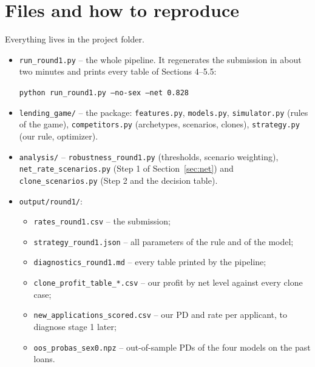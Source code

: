 \documentclass[11pt,a4paper]{article}
\newcommand{\code}[1]{\texttt{#1}}
\begin{document}
\section{Files and how to reproduce}
Everything lives in the project folder.
\begingroup\sloppy
\begin{itemize}
  \item \code{run\_round1.py} -- the whole pipeline. It regenerates the submission in about two minutes and
        prints every table of Sections 4--5.5:
        \begin{center}\code{python run\_round1.py --no-sex --net 0.828}\end{center}
  \item \code{lending\_game/} -- the package: \code{features.py}, \code{models.py}, \code{simulator.py}
        (rules of the game), \code{competitors.py} (archetypes, scenarios, clones), \code{strategy.py} (our rule,
        optimizer).
  \item \code{analysis/} -- \code{robustness\_round1.py} (thresholds, scenario weighting),
        \code{net\_rate\_scenarios.py} (Step 1 of Section~\ref{sec:net}) and \code{clone\_scenarios.py}
        (Step 2 and the decision table).
  \item \code{output/round1/}:
    \begin{itemize}
      \item \code{rates\_round1.csv} -- the submission;
      \item \code{strategy\_round1.json} -- all parameters of the rule and of the model;
      \item \code{diagnostics\_round1.md} -- every table printed by the pipeline;
      \item \code{clone\_profit\_table\_*.csv} -- our profit by net level against every clone case;
      \item \code{new\_applications\_scored.csv} -- our PD and rate per applicant, to diagnose stage 1 later;
      \item \code{oos\_probas\_sex0.npz} -- out-of-sample PDs of the four models on the past loans.
    \end{itemize}
\end{itemize}
\endgroup
\end{document}
